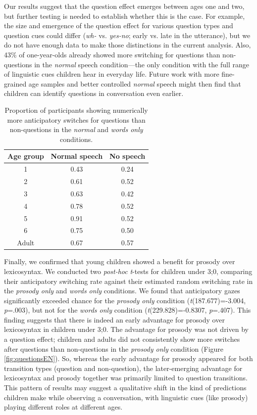 \documentclass[authoryear, 12pt]{elsarticle}
\begin{document}
Our results suggest that the question effect emerges between ages one and two, but further testing is needed to establish whether this is the case. For example, the size and emergence of the question effect for various question types and question cues could differ (\textit{wh-} vs. \textit{yes-no}; early vs. late in the utterance), but we do not have enough data to make those distinctions in the current analysis. Also, 43\% of one-year-olds already showed more switching for questions than non-questions in the \textit{normal} speech condition---the only condition with the full range of linguistic cues children hear in everyday life. Future work with more fine-grained age samples and better controlled \textit{normal} speech might then find that children can identify questions in conversation even earlier.

\begin{table}[t]
\begin{center}
  \begin{tabular}{ccc}
    \hline
    Age group & Normal speech & No speech \\ 
    \hline
    1 & 0.43 & 0.24 \\
    2 & 0.61 & 0.52 \\
    3 & 0.63 & 0.42 \\
    4 & 0.78 & 0.52 \\
    5 & 0.91 & 0.52 \\
    6 & 0.75 & 0.50 \\
    Adult & 0.67 & 0.57 \\
    \hline
  \end{tabular}
\end{center}
  \caption{Proportion of participants showing numerically more anticipatory switches for questions than non-questions in the \textit{normal} and \textit{words only} conditions.}
\label{tab:questioneffectexp2}
\end{table}

Finally, we confirmed that young children showed a benefit for prosody over lexicosyntax. We conducted two \textit{post-hoc} \textit{t}-tests for children under 3;0, comparing their anticipatory switching rate against their estimated random switching rate in the \textit{prosody only} and \textit{words only} conditions. We found that anticipatory gazes significantly exceeded chance for the \textit{prosody only} condition (\textit{t}(187.677)=-3.004, \textit{p}=.003), but not for the \textit{words only} condition (\textit{t}(229.828)=-0.8307, \textit{p}=.407). This finding suggests that there is indeed an early advantage for prosody over lexicosyntax in children under 3;0. The advantage for prosody was not driven by a question effect; children and adults did not consistently show more switches after questions than non-questions in the \textit{prosody only} condition (Figure \ref{fig:questionsEN}). So, whereas the early advantage for prosody appeared for both transition types (question and non-question), the later-emerging advantage for lexicosyntax and prosody together was primarily limited to question transitions. This pattern of results may suggest a qualitative shift in the kind of predictions children make while observing a conversation, with linguistic cues (like prosody) playing different roles at different ages.
\end{document}
